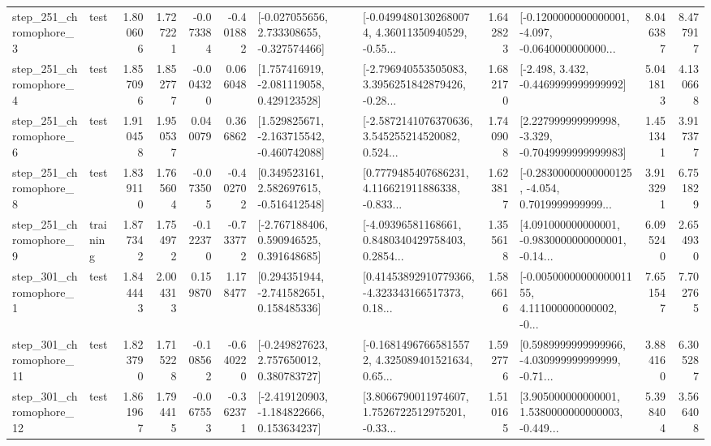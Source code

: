 \begin{tabular}{llrrrrllrlrr}
   step\_251\_chromophore\_3 &      test &      1.800606 &    1.727221 &     -0.073384 & -0.401882 &   [-0.027055656, 2.733308655, -0.327574466] &  [-0.04994801302680074, 4.36011350940529, -0.55... &       1.642823 &  [-0.1200000000000001, -4.097, -0.0640000000000... &            8.046387 &          8.477917 \\
   step\_251\_chromophore\_4 &      test &      1.857096 &    1.852777 &     -0.004320 &  0.066048 &    [1.757416919, -2.081119058, 0.429123528] &  [-2.796940553505083, 3.3956251842879426, -0.28... &       1.682170 &               [-2.498, 3.432, -0.4469999999999992] &            5.041813 &          4.130668 \\
   step\_251\_chromophore\_6 &      test &      1.910458 &    1.950537 &      0.040079 &  0.366862 &   [1.529825671, -2.163715542, -0.460742088] &  [-2.5872141076370636, 3.545255214520082, 0.524... &       1.740908 &   [2.227999999999998, -3.329, -0.7049999999999983] &            1.451341 &          3.917377 \\
   step\_251\_chromophore\_8 &      test &      1.839110 &    1.765604 &     -0.073505 & -0.402702 &    [0.349523161, 2.582697615, -0.516412548] &  [0.7779485407686231, 4.116621911886338, -0.833... &       1.623817 &  [-0.28300000000000125, -4.054, 0.7019999999999... &            3.913291 &          6.751829 \\
   step\_251\_chromophore\_9 &  training &      1.877342 &    1.754972 &     -0.122370 & -0.733772 &    [-2.767188406, 0.590946525, 0.391648685] &  [-4.09396581168661, 0.8480340429758403, 0.2854... &       1.355618 &  [4.091000000000001, -0.9830000000000001, -0.14... &            6.095240 &          2.654930 \\
   step\_301\_chromophore\_1 &      test &      1.844443 &    2.004313 &      0.159870 &  1.178477 &    [0.294351944, -2.741582651, 0.158485336] &  [0.41453892910779366, -4.323343166517373, 0.18... &       1.586616 &  [-0.0050000000000001155, 4.111000000000002, -0... &            7.651547 &          7.702765 \\
  step\_301\_chromophore\_11 &      test &      1.823790 &    1.715228 &     -0.108562 & -0.640220 &    [-0.249827623, 2.757650012, 0.380783727] &  [-0.16814967665815572, 4.325089401521634, 0.65... &       1.592776 &  [0.5989999999999966, -4.030999999999999, -0.71... &            3.884160 &          6.305287 \\
  step\_301\_chromophore\_12 &      test &      1.861967 &    1.794415 &     -0.067553 & -0.362371 &   [-2.419120903, -1.184822666, 0.153634237] &  [3.8066790011974607, 1.7526722512975201, -0.33... &       1.510165 &  [3.905000000000001, 1.5380000000000003, -0.449... &            5.398404 &          3.566408 \\

\end{tabular}
